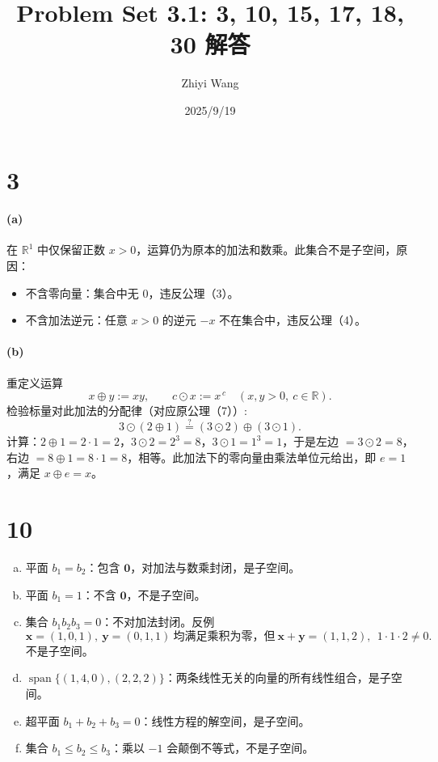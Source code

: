 \documentclass[12pt]{ctexart}
\title{Problem Set 3.1: 3, 10, 15, 17, 18, 30 解答}
\author{Zhiyi Wang}
\date{2025/9/19}
\DeclareMathOperator{\Span}{span}
\begin{document}
\maketitle

\section*{3}
\paragraph{(a)} 在 $\mathbb{R}^1$ 中仅保留正数 $x>0$，运算仍为原本的加法和数乘。此集合不是子空间，原因：
\begin{itemize}
  \item 不含零向量：集合中无 $0$，违反公理（3）。
  \item 不含加法逆元：任意 $x>0$ 的逆元 $-x$ 不在集合中，违反公理（4）。
\end{itemize}

\paragraph{(b)} 重定义运算
\[
x\oplus y := xy,\qquad c\odot x := x^{\,c}\quad(x,y>0,\ c\in\mathbb{R}).
\]
检验标量对此加法的分配律（对应原公理（7））:
\[
3\odot(2\oplus 1) \stackrel{?}{=} (3\odot 2)\oplus(3\odot 1).
\]
计算：$2\oplus 1=2\cdot 1=2$，$3\odot 2=2^3=8$，$3\odot 1=1^3=1$，于是左边 $=3\odot 2=8$，右边 $=8\oplus 1=8\cdot 1=8$，相等。此加法下的零向量由乘法单位元给出，即 $e=1$，满足 $x\oplus e=x$。

\section*{10}
\begin{enumerate}[(a)]
  \item 平面 $b_1=b_2$：包含 $\mathbf{0}$，对加法与数乘封闭，是子空间。
  \item 平面 $b_1=1$：不含 $\mathbf{0}$，不是子空间。
  \item 集合 $b_1b_2b_3=0$：不对加法封闭。反例
  \[
  \mathbf{x}=(1,0,1),\ \mathbf{y}=(0,1,1)\ \text{均满足乘积为零，但}\ 
  \mathbf{x}+\mathbf{y}=(1,1,2),\ \ 1\cdot 1\cdot 2\ne 0.
  \]
  不是子空间。
  \item $\Span\{(1,4,0),(2,2,2)\}$：两条线性无关的向量的所有线性组合，是子空间。
  \item 超平面 $b_1+b_2+b_3=0$：线性方程的解空间，是子空间。
  \item 集合 $b_1\le b_2\le b_3$：乘以 $-1$ 会颠倒不等式，不是子空间。
\end{enumerate}
\end{document}
